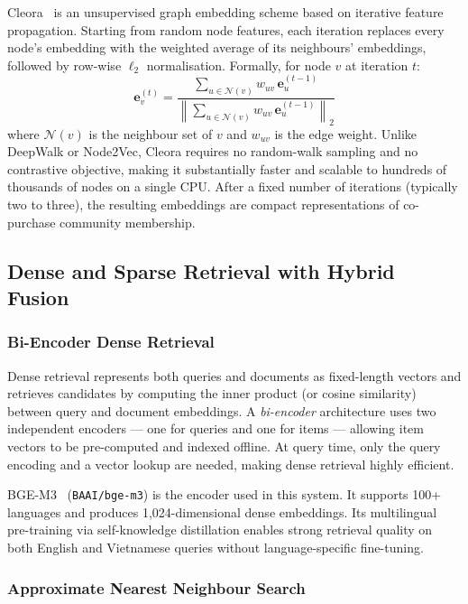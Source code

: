 Cleora~\cite{rychalska2021cleora} is an unsupervised graph embedding scheme based on iterative feature propagation.
Starting from random node features, each iteration replaces every node's embedding with the weighted average of its neighbours' embeddings, followed by row-wise $\ell_2$ normalisation.
Formally, for node $v$ at iteration $t$:
\begin{equation}
  \mathbf{e}_v^{(t)} = \frac{\sum_{u \in \mathcal{N}(v)} w_{uv}\, \mathbf{e}_u^{(t-1)}}{\left\| \sum_{u \in \mathcal{N}(v)} w_{uv}\, \mathbf{e}_u^{(t-1)} \right\|_2}
\end{equation}
where $\mathcal{N}(v)$ is the neighbour set of $v$ and $w_{uv}$ is the edge weight.
Unlike DeepWalk or Node2Vec, Cleora requires no random-walk sampling and no contrastive objective, making it substantially faster and scalable to hundreds of thousands of nodes on a single CPU.
After a fixed number of iterations (typically two to three), the resulting embeddings are compact representations of co-purchase community membership.

\subsection{Dense and Sparse Retrieval with Hybrid Fusion}
\label{sec:retrieval}

\subsubsection{Bi-Encoder Dense Retrieval}

Dense retrieval represents both queries and documents as fixed-length vectors and retrieves candidates by computing the inner product (or cosine similarity) between query and document embeddings.
A \textit{bi-encoder} architecture uses two independent encoders — one for queries and one for items — allowing item vectors to be pre-computed and indexed offline.
At query time, only the query encoding and a vector lookup are needed, making dense retrieval highly efficient.

BGE-M3~\cite{chen2024bge} (\texttt{BAAI/bge-m3}) is the encoder used in this system.
It supports 100+ languages and produces 1{,}024-dimensional dense embeddings.
Its multilingual pre-training via self-knowledge distillation enables strong retrieval quality on both English and Vietnamese queries without language-specific fine-tuning.

\subsubsection{Approximate Nearest Neighbour Search}

